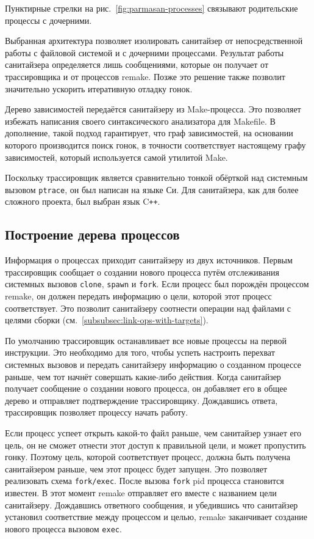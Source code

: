 Пунктирные стрелки на рис.~\ref{fig:parmasan-processes} связывают родительские процессы с дочерними.

Выбранная архитектура позволяет изолировать санитайзер от непосредственной работы с файловой системой и с дочерними процессами. Результат работы санитайзера определяется лишь сообщениями, которые он получает от трассировщика и от процессов remake. Позже это решение также позволит значительно ускорить итеративную отладку гонок.

Дерево зависимостей передаётся санитайзеру из Make-процесса. Это позволяет избежать написания своего синтаксического анализатора для Makefile. В дополнение, такой подход гарантирует, что граф зависимостей, на основании которого производится поиск гонок, в точности соответствует настоящему графу зависимостей, который используется самой утилитой Make.

Поскольку трассировщик является сравнительно тонкой обёрткой над системным вызовом \texttt{ptrace}, он был написан на языке Си. Для санитайзера, как для более сложного проекта, был выбран язык C\texttt{++}.

\subsection{Построение дерева процессов}

Информация о процессах приходит санитайзеру из двух источников. Первым трассировщик сообщает о создании нового процесса путём отслеживания системных вызовов \texttt{clone}, \texttt{spawn} и \texttt{fork}. Если процесс был порождён процессом remake, он должен передать информацию о цели, которой этот процесс соответствует. Это позволит санитайзеру соотнести операции над файлами с целями сборки (см.~\ref{subsubsec:link-ops-with-targets}).

По умолчанию трассировщик останавливает все новые процессы на первой инструкции. Это необходимо для того, чтобы успеть настроить перехват системных вызовов и передать санитайзеру информацию о созданном процессе раньше, чем тот начнёт совершать какие-либо действия. Когда санитайзер получает сообщение о создании нового процесса, он добавляет его в общее дерево и отправляет подтверждение трассировщику. Дождавшись ответа, трассировщик позволяет процессу начать работу.

Если процесс успеет открыть какой-то файл раньше, чем санитайзер узнает его цель, он не сможет отнести этот доступ к правильной цели, и может пропустить гонку. Поэтому цель, которой соответствует процесс, должна быть получена санитайзером раньше, чем этот процесс будет запущен. Это позволяет реализовать схема \texttt{fork/exec}. После вызова \texttt{fork} pid процесса становится известен. В этот момент remake отправляет его вместе с названием цели санитайзеру. Дождавшись ответного сообщения, и убедившись что санитайзер установил соответствие между процессом и целью, remake заканчивает создание нового процесса вызовом \texttt{exec}.

